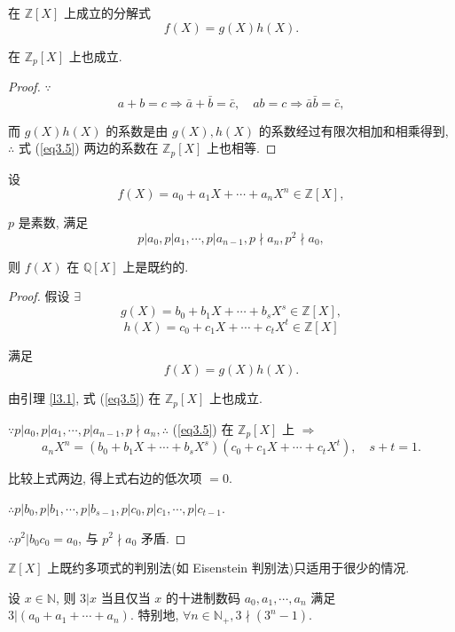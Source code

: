 \documentclass[UTF8]{ctexart}
\begin{document}
\begin{lemma}\label{l3.1}
    在 $\mathbb{Z}[X]$ 上成立的分解式
    \begin{equation}\label{eq3.4}
        f(X)=g(X)h(X).
    \end{equation}

    在 $\mathbb{Z}_p[X]$ 上也成立.
\end{lemma}
\begin{proof}
    $\because$
    \[a+b=c\Rightarrow\bar{a}+\bar{b}=\bar{c},\quad ab=c\Rightarrow\bar{a}\bar{b}=\bar{c},\]

    而 $g(X)h(X)$ 的系数是由 $g(X),h(X)$ 的系数经过有限次相加和相乘得到, $\therefore$ 式 (\ref{eq3.5}) 两边的系数在 $\mathbb{Z}_p[X]$ 上也相等.
\end{proof}
\begin{theorem}
    设
    \[f(X)=a_0+a_1X+\cdots+a_nX^n\in\mathbb{Z}[X],\]

    $p$ 是素数, 满足
    \[p|a_0,p|a_1,\cdots,p|a_{n-1},p\nmid a_n,p^2\nmid a_0,\]
    
    则 $f(X)$ 在 $\mathbb{Q}[X]$ 上是既约的.
\end{theorem}
\begin{proof}
    假设 $\exists$
    \[g(X)=b_0+b_1X+\cdots+b_sX^s\in\mathbb{Z}[X],\]
    \[h(X)=c_0+c_1X+\cdots+c_tX^t\in\mathbb{Z}[X]\]
    
    满足
    \begin{equation}\label{eq3.5}
        f(X)=g(X)h(X).
    \end{equation}

    由引理 \ref{l3.1}, 式 (\ref{eq3.5}) 在 $\mathbb{Z}_p[X]$ 上也成立.
    
    $\because p|a_0,p|a_1,\cdots,p|a_{n-1},p\nmid a_n,\therefore$ (\ref{eq3.5}) 在 $\mathbb{Z}_p[X]$ 上 $\Rightarrow$
    \[a_nX^n=(b_0+b_1X+\cdots+b_sX^s)(c_0+c_1X+\cdots+c_tX^t),\quad s+t=1.\]

    比较上式两边, 得上式右边的低次项 $=0$.

    $\therefore p|b_0,p|b_1,\cdots,p|b_{s-1},p|c_0,p|c_1,\cdots,p|c_{t-1}$.

    $\therefore p^2|b_0c_0=a_0$, 与 $p^2\nmid a_0$ 矛盾.
\end{proof}
$\mathbb{Z}[X]$ 上既约多项式的判别法(如 Eisenstein 判别法)只适用于很少的情况.
\begin{lemma}\label{l3.2}
    设 $x\in\mathbb{N}$, 则 $3|x$ 当且仅当 $x$ 的十进制数码 $a_0,a_1,\cdots,a_n$ 满足 $3|(a_0+a_1+\cdots+a_n)$. 特别地, $\forall n\in\mathbb{N}_+,3\nmid(3^n-1)$.
\end{lemma}
\end{document}

